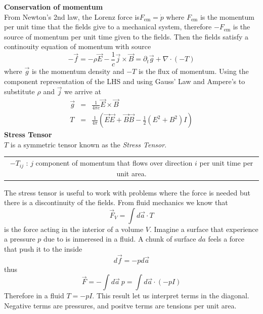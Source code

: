 \documentclass[12pt,a4paper]{article}
\begin{document}
\textbf{Conservation of momentum}\\
From Newton's 2nd law, the Lorenz force is$F_{\text{em}} = \dot{p}$ where $F_{\text{em}}$ is  the momentum per unit time that the fields give to a mechanical system, therefore $-F_{\text{em}}$ is the source of momentum per unit time given to the fields. Then the fields satisfy a continouity equation of momentum with source
\begin{equation}
	-\vec{f} = -\rho \vec{E} - \frac{1}{c}\vec{j}\times \vec{B} = \partial_t \vec{g} + \nabla\cdot(-T)
\end{equation}
where $\vec{g}$ is the momentum density and $-T$ is the flux of momentum. Using the component representation of the LHS and using Gauss' Law and Ampere's to substitute $\rho$ and $\vec{j}$ we arrive at
\begin{eqnarray}
	\vec{g} & = & \frac{1}{4\pi c} \vec{E}\times \vec{B} \\
	T & = & \frac{1}{4\pi} \left(\vec{E}\vec{E}+\vec{B}\vec{B}-\frac{1}{2}(E^2 + B^2)I\right)
\end{eqnarray}
\textbf{Stress Tensor}\\
$T$ is a symmetric tensor known as the \textit{Stress Tensor}.

\begin{tabular}{c}
$-T_{ij}$ :  $j$ component of momentum that flows over direction $i$ per unit time per unit area. 
\end{tabular} 

The stress tensor is useful to work with problems where the force is needed but there is a discontinuity of the fields.
From fluid mechanics we know that
\begin{equation}
	\vec{F}_V = \int d\vec{a}\cdot T
\end{equation}
is the force acting in the interior of a volume $V$. Imagine a surface that experience a pressure $p$ due to is inmeresed in a fluid. A chunk of surface $da$ feels a force that push it to the inside
\begin{equation}
	d\vec{f} = - p d\vec{a}
\end{equation}
thus
\begin{equation}
	\vec{F} = -\int d\vec{a} \ p = \int d\vec{a} \cdot (-pI)
\end{equation}
Therefore in a fluid $T = -p I$. This result let us interpret terms in the diagonal. Negative terms are pressures, and positve terms are tensions per unit area.
\end{document}
